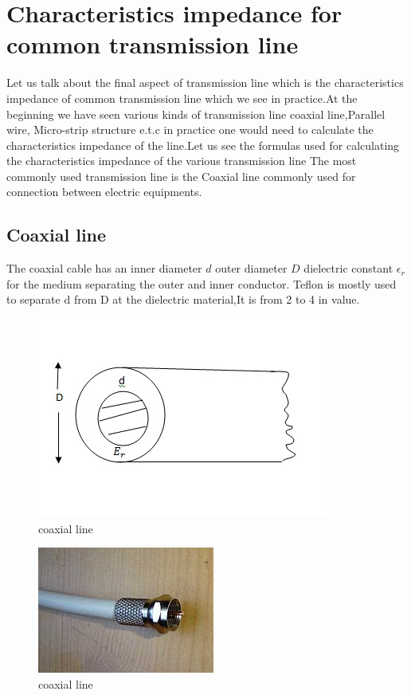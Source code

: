 \section{Characteristics impedance for common transmission line}
Let us talk about the final aspect of transmission line which is the characteristics impedance of common transmission line which we see in practice.At the beginning we have seen various kinds of transmission line coaxial line,Parallel wire, Micro-strip structure e.t.c in practice one would need to calculate the characteristics impedance of the line.Let us see the formulas used for calculating the characteristics impedance of the various transmission line The most commonly used transmission line is the Coaxial line commonly used for connection between  electric equipments.

\subsection{Coaxial line}
The coaxial cable has an inner diameter $d$ outer  diameter $D$  dielectric constant $\epsilon_r$ for the medium separating the outer and inner conductor. Teflon is mostly used to separate d from D at the dielectric material,It is from 2 to 4 in value.
\begin{figure}[h]
\centering
\includegraphics[width=1\linewidth]{./graphics/coaxialcable1}
\caption{coaxial line}
\end{figure}
\begin{figure}[h]
\centering
\includegraphics[scale=0.8]{./graphics/coaxialcable}
\caption{coaxial line}
\end{figure}

